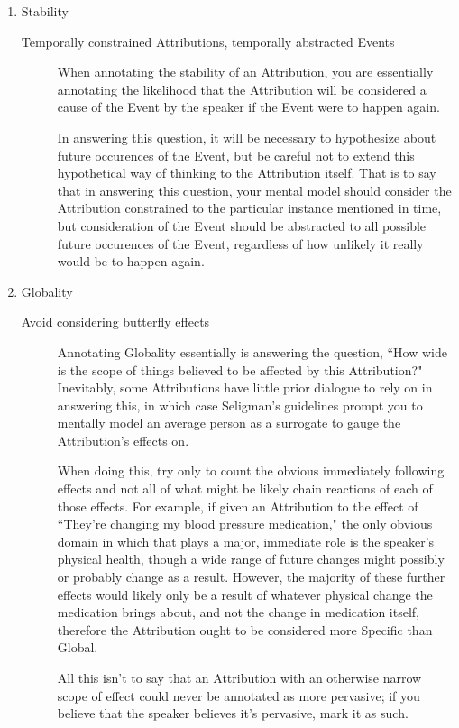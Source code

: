 \documentclass[a4paper,12pt]{article}
\begin{document}
\begin{enumerate}
    \item Stability
        \begin{description}
            \item[Temporally constrained Attributions, temporally abstracted Events] When annotating the stability of an Attribution, you are essentially annotating the likelihood that the Attribution will be considered a cause of the Event by the speaker if the Event were to happen again.

                In answering this question, it will be necessary to hypothesize about future occurences of the Event, but be careful not to extend this hypothetical way of thinking to the Attribution itself. That is to say that in answering this question, your mental model should consider the Attribution constrained to the particular instance mentioned in time, but consideration of the Event should be abstracted to all possible future occurences of the Event, regardless of how unlikely it really would be to happen again.
        \end{description}

    \item Globality
        \begin{description}
            \item[Avoid considering butterfly effects] Annotating Globality essentially is answering the question, ``How wide is the scope of things believed to be affected by this Attribution?" Inevitably, some Attributions have little prior dialogue to rely on in answering this, in which case Seligman's guidelines prompt you to mentally model an average person as a surrogate to gauge the Attribution's effects on.

                When doing this, try only to count the obvious immediately following effects and not all of what might be likely chain reactions of each of those effects. For example, if given an Attribution to the effect of ``They're changing my blood pressure medication," the only obvious domain in which that plays a major, immediate role is the speaker's physical health, though a wide range of future changes might possibly or probably change as a result. However, the majority of these further effects would likely only be a result of whatever physical change the medication brings about, and not the change in medication itself, therefore the Attribution ought to be considered more Specific than Global.

                All this isn't to say that an Attribution with an otherwise narrow scope of effect could never be annotated as more pervasive; if you believe that the speaker believes it's pervasive, mark it as such.
        \end{description}
    \end{enumerate}
\end{document}
